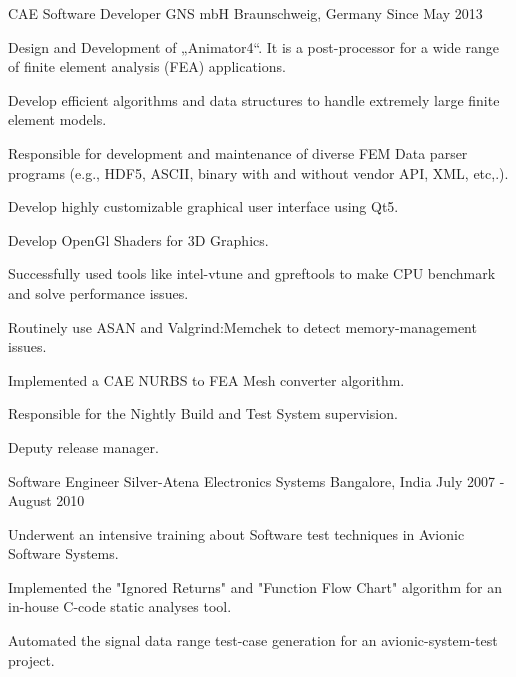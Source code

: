 
\begin{cventries}
\cventry
    {CAE Software Developer}
    {GNS mbH}
    {Braunschweig, Germany}
    {Since May 2013 }
    {
      \begin{cvitems}
        \item {Design and Development of „Animator4“. It is a post-processor for a wide range of finite element analysis (FEA) applications.}
        \item {Develop efficient algorithms and data structures to handle extremely large finite element models.}
        \item {Responsible for development and maintenance of diverse FEM Data parser programs (e.g., HDF5, ASCII, binary with and without vendor API, XML, etc,.).}
        \item {Develop highly customizable graphical user interface using Qt5.}
        \item {Develop OpenGl Shaders for 3D Graphics.}
        \item {Successfully used tools like intel-vtune and gpreftools to make CPU benchmark and solve performance issues.}
        \item {Routinely use ASAN and Valgrind:Memchek to detect memory-management issues.}
        \item {Implemented a CAE NURBS to FEA Mesh converter algorithm.}
        \item {Responsible for the Nightly Build and Test System supervision.}
        \item {Deputy release manager.}
      \end{cvitems}
    }

\cventry
    {Software Engineer}
    {Silver-Atena Electronics Systems }
    {Bangalore, India}
    {July 2007 -  August 2010 }
    {
      \begin{cvitems}
        \item {Underwent an intensive training about Software test techniques in Avionic Software Systems.}
        \item {Implemented the "Ignored Returns" and "Function Flow Chart" algorithm for an in-house C-code static analyses tool.}
        \item {Automated the signal data range test-case generation for an avionic-system-test project.}                       
      \end{cvitems}
    }
\end{cventries}


